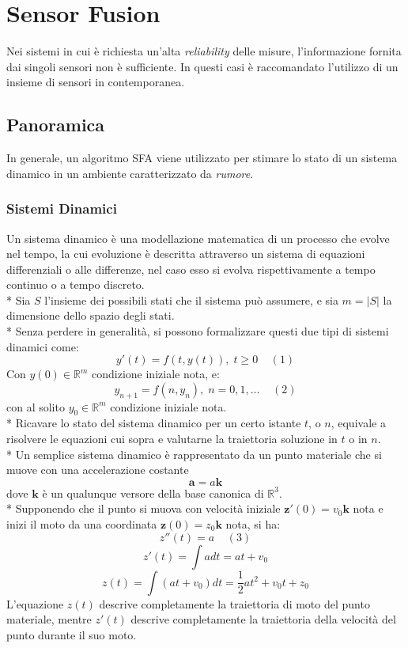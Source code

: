 \chapter{Sensor Fusion}
Nei sistemi in cui \`e richiesta un'alta \emph{reliability} delle misure, l'informazione fornita dai singoli sensori non \`e sufficiente. In questi casi \`e raccomandato l'utilizzo di un insieme di sensori in contemporanea.
\section{Panoramica}
In generale, un algoritmo SFA viene utilizzato per stimare lo stato di un sistema dinamico in un ambiente caratterizzato da \emph{rumore}.
\subsection{Sistemi Dinamici}
Un sistema dinamico \`e una modellazione matematica di un processo che evolve nel tempo, la cui evoluzione \`e descritta attraverso un sistema di equazioni differenziali o alle differenze, nel caso esso si evolva rispettivamente a tempo continuo o a tempo discreto.\\*
Sia $S$ l'insieme dei possibili stati che il sistema pu\`o assumere, e sia $m = |S|$ la dimensione dello spazio degli stati.\\*
Senza perdere in generalit\`a, si possono formalizzare questi due tipi di sistemi dinamici come:
$$
y'(t) = f(t,y(t)),\;t\ge 0\;\;\;\;(1)
$$
Con $y(0) \in \mathbb{R}^m$ condizione iniziale nota, e:
$$
y_{n+1} = f(n,y_n),\;n = 0,1,\dots\;\;\;\;(2)
$$
con al solito $y_0 \in \mathbb{R}^m$ condizione iniziale nota.\\*
Ricavare lo stato del sistema dinamico per un certo istante $t$, o $n$, equivale a risolvere le equazioni cui sopra e valutarne la traiettoria soluzione in $t$ o in $n$.\\*
Un semplice sistema dinamico \`e rappresentato da un punto materiale che si muove con una accelerazione costante $$\mathbf{a} = a\mathbf{k}$$ dove $\mathbf{k}$ \`e un qualunque versore della base canonica di $\mathbb{R}^3$.\\*
Supponendo che il punto si muova con velocit\`a iniziale $\mathbf{z'}(0) = v_0\mathbf{k}$ nota e inizi il moto da una coordinata $\mathbf z(0) = z_0\mathbf{k}$ nota, si ha:
$$
z''(t) = a\;\;\;\;(3)
$$
$$
z'(t) = \int{a dt} = a t + v_0
$$
$$
z(t) = \int(a t + v_0)dt = \frac{1}{2} at^2 +  v_0 t + z_0
$$
L'equazione $z(t)$ descrive completamente la traiettoria di moto del punto materiale, mentre $z'(t)$ descrive completamente la traiettoria della velocit\`a del punto durante il suo moto.
